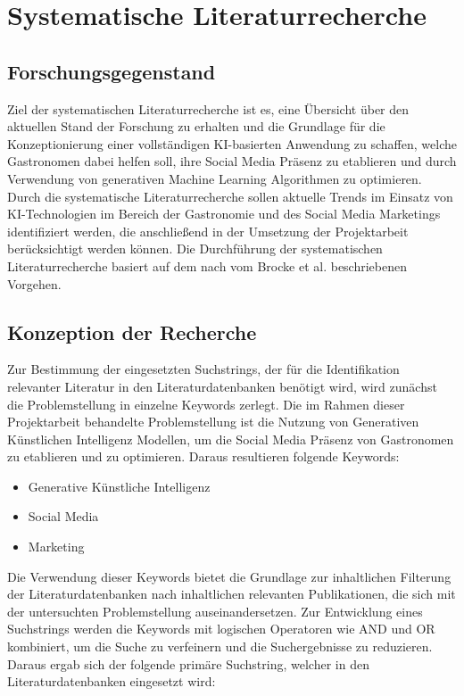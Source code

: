 \documentclass[11pt]{article}
\begin{document}
\section{Systematische Literaturrecherche} \label{sec:literaturrecherche}
\subsection{Forschungsgegenstand}

Ziel der systematischen Literaturrecherche ist es, eine Übersicht über den aktuellen Stand der Forschung zu erhalten und die Grundlage für die Konzeptionierung einer vollständigen KI-basierten Anwendung zu schaffen, welche Gastronomen dabei helfen soll, ihre Social Media Präsenz zu etablieren und durch Verwendung von generativen Machine Learning Algorithmen zu optimieren.
Durch die systematische Literaturrecherche sollen aktuelle Trends im Einsatz von KI-Technologien im Bereich der Gastronomie und des Social Media Marketings identifiziert werden, die anschließend in der Umsetzung der Projektarbeit berücksichtigt werden können.
Die Durchführung der systematischen Literaturrecherche basiert auf dem nach vom Brocke et al. beschriebenen Vorgehen.

\subsection{Konzeption der Recherche} \label{sec:literaturrecherche_orga}

Zur Bestimmung der eingesetzten Suchstrings, der für die Identifikation relevanter Literatur in den Literaturdatenbanken benötigt wird, wird zunächst die Problemstellung in einzelne Keywords zerlegt.
Die im Rahmen dieser Projektarbeit behandelte Problemstellung ist die Nutzung von Generativen Künstlichen Intelligenz Modellen, um die Social Media Präsenz von Gastronomen zu etablieren und zu optimieren.
Daraus resultieren folgende Keywords:

\begin{itemize}
    \item Generative Künstliche Intelligenz
    \item Social Media
    \item Marketing
\end{itemize}

Die Verwendung dieser Keywords bietet die Grundlage zur inhaltlichen Filterung der Literaturdatenbanken nach inhaltlichen relevanten Publikationen, die sich mit der untersuchten Problemstellung auseinandersetzen.
Zur Entwicklung eines Suchstrings werden die Keywords mit logischen Operatoren wie AND und OR kombiniert, um die Suche zu verfeinern und die Suchergebnisse zu reduzieren.
Daraus ergab sich der folgende primäre Suchstring, welcher in den Literaturdatenbanken eingesetzt wird:
\end{document}
